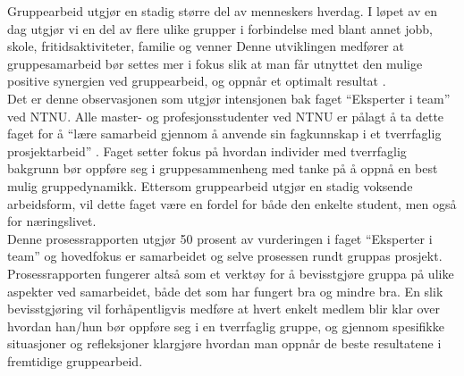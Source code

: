 Gruppearbeid utgjør en stadig større del av menneskers hverdag. I løpet av en dag utgjør vi en del av flere ulike grupper i forbindelse med blant annet jobb, skole, fritidsaktiviteter, familie og venner \cite{gruppeteori} Denne utviklingen medfører at gruppesamarbeid bør settes mer i fokus slik at man får utnyttet den mulige positive synergien ved gruppearbeid, og oppnår et optimalt resultat \cite{gruppeteori}.\\

Det er denne observasjonen som utgjør intensjonen bak faget “Eksperter i team” ved NTNU. Alle master- og profesjonsstudenter ved NTNU er pålagt å ta dette faget for å “lære samarbeid gjennom å anvende sin fagkunnskap i et tverrfaglig prosjektarbeid” \cite{website:emnebeskrivelse}. Faget setter fokus på hvordan individer med tverrfaglig bakgrunn bør oppføre seg i gruppesammenheng med tanke på å oppnå en best mulig gruppedynamikk. Ettersom gruppearbeid utgjør en stadig voksende arbeidsform, vil dette faget være en fordel for både den enkelte student, men også for næringslivet.\\

Denne prosessrapporten utgjør 50 prosent av vurderingen i faget “Eksperter i team” og hovedfokus er samarbeidet og selve prosessen rundt gruppas prosjekt. Prosessrapporten fungerer altså som et verktøy for å bevisstgjøre gruppa på ulike aspekter ved samarbeidet, både det som har fungert bra og mindre bra. En slik bevisstgjøring vil forhåpentligvis medføre at hvert enkelt medlem blir klar over hvordan han/hun bør oppføre seg i en tverrfaglig gruppe, og gjennom spesifikke situasjoner og refleksjoner klargjøre hvordan man oppnår de beste resultatene i fremtidige gruppearbeid.
